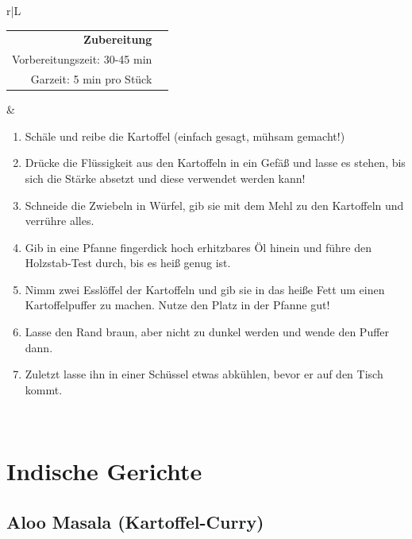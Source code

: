 \documentclass[a4paper, 12pt]{scrbook} 								%
\numberwithin{equation}{section} 									%
\begin{document}
		\newpage
		\begin{tabularx}{\textwidth}{r|L}	


			\begin{tabular}[t]{rr}
				\textbf{Zubereitung}	\\
				Vorbereitungszeit: 30-45 min	\\
				Garzeit: 5 min pro Stück		\\
			\end{tabular}			&	\begin{enumerate}[nosep]
											\item Schäle und reibe die Kartoffel (einfach gesagt, mühsam gemacht!)
											\item Drücke die Flüssigkeit aus den Kartoffeln in ein Gefäß und lasse es stehen, bis sich die Stärke absetzt und diese verwendet werden kann!
											\item Schneide die Zwiebeln in Würfel, gib sie mit dem Mehl zu den Kartoffeln und verrühre alles.
											\item Gib in eine Pfanne fingerdick hoch erhitzbares Öl hinein und führe den Holzstab-Test durch, bis es heiß genug ist.
											\item Nimm zwei Esslöffel der Kartoffeln und gib sie in das heiße Fett um einen Kartoffelpuffer zu machen. Nutze den Platz in der Pfanne gut!
											\item Lasse den Rand braun, aber nicht zu dunkel werden und wende den Puffer dann.
											\item Zuletzt lasse ihn in einer Schüssel etwas abkühlen, bevor er auf den Tisch kommt. 
										\end{enumerate}	\\
		\end{tabularx}
		\newpage

		\section{Indische Gerichte}


			\subsection{Aloo Masala (Kartoffel-Curry)}	\label{aloo_masala}
\end{document}
